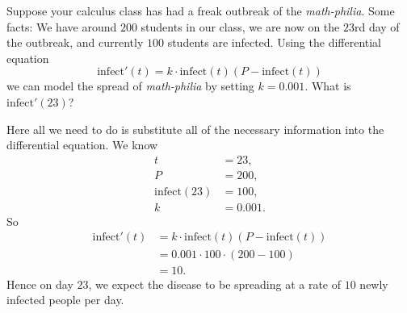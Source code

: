\documentclass{ximera}
\begin{document}
\begin{example}
  Suppose your calculus class has had a freak outbreak of the
  \textit{math-philia}. Some facts: We have around $200$ students in
  our class, we are now on the $23$rd day of the outbreak, and
  currently $100$ students are infected. Using the differential
  equation
  \[
  \mathrm{infect}'(t) = k\cdot \mathrm{infect}(t)(P-\mathrm{infect}(t))
  \]
  we can model the spread of \textit{math-philia} by setting $k=0.001$.
  What is $\mathrm{infect}'(23)$?

  \begin{explanation}
    Here all we need to do is substitute all of the necessary
    information into the differential equation. We know
    \begin{align*}
    t &= 23,\\
    P &= 200,\\
    \mathrm{infect}(23) &= 100,\\
    k&= 0.001.
    \end{align*}
    So
    \begin{align*}
      \mathrm{infect}'(t) &= k\cdot \mathrm{infect}(t)(P-\mathrm{infect}(t))\\
      &= 0.001\cdot 100\cdot(200-100)\\
      &=10.
    \end{align*}
    Hence on day $23$, we expect the disease to be spreading at a rate
    of $10$ newly infected people per day.
  \end{explanation}
\end{example}


\end{document}
